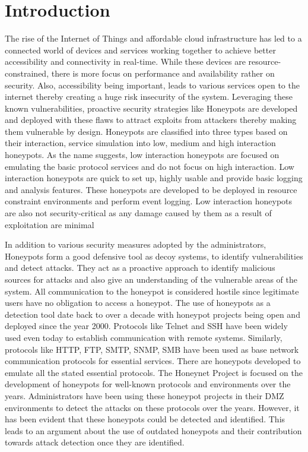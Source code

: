 \section{Introduction}

The rise of the Internet of Things and affordable cloud infrastructure has led to a connected world of devices and services working together to achieve better accessibility and connectivity in real-time. While these devices are resource-constrained, there is more focus on performance and availability rather on security. Also, accessibility being important, leads to various services open to the internet thereby creating a huge risk insecurity of the system. Leveraging these known vulnerabilities, proactive security strategies like Honeypots are developed and deployed with these flaws to attract exploits from attackers thereby making them vulnerable by design. Honeypots are classified into three types based on their interaction, service simulation into low, medium and high interaction honeypots. As the name suggests, low interaction honeypots are focused on emulating the basic protocol services and do not focus on high interaction. Low interaction honeypots are quick to set up, highly usable and provide basic logging and analysis features. These honeypots are developed to be deployed in resource constraint environments and perform event logging. Low interaction honeypots are also not security-critical as any damage caused by them as a result of exploitation are minimal 

In addition to various security measures adopted by the administrators, Honeypots form a good defensive tool as decoy systems, to identify vulnerabilities and detect attacks. They act as a proactive approach to identify malicious sources for attacks and also give an understanding of the vulnerable areas of the system. All communication to the honeypot is considered hostile since legitimate users have no obligation to access a honeypot. The use of honeypots as a detection tool date back to over a decade with honeypot projects being open and deployed since the year 2000. Protocols like Telnet and SSH have been widely used even today to establish communication with remote systems. Similarly, protocols like HTTP, FTP, SMTP, SNMP, SMB have been used as base network communication protocols for essential services. There are honeypots developed to emulate all the stated essential protocols. The Honeynet Project \cite{Honeynet} is focused on the development of honeypots for well-known protocols and environments over the years. Administrators have been using these honeypot projects in their DMZ environments to detect the attacks on these protocols over the years. However, it has been evident that these honeypots could be detected and identified. This leads to an argument about the use of outdated honeypots \cite{counting} and their contribution towards attack detection once they are identified.

